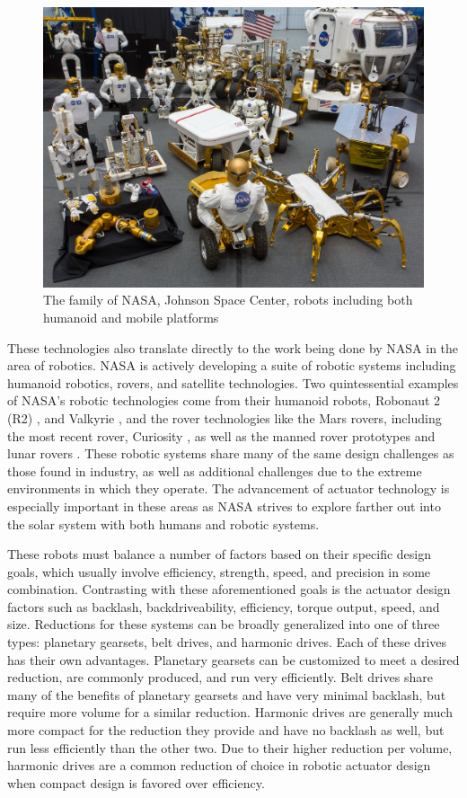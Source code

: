 \begin{figure}[!b]
   \centering
   \includegraphics[width=0.7\linewidth]{fig/robot_collage}
   \caption{The family of NASA, Johnson Space Center, robots including both humanoid and mobile platforms}
   \label{fig/robot_collage}
\end{figure}

These technologies also translate directly to the work being done by NASA in the area of robotics. 
NASA is actively developing a suite of robotic systems including humanoid robotics, rovers, and satellite technologies. 
Two quintessential examples of NASA's robotic technologies come from their humanoid robots, Robonaut 2 (R2) \cite{ref:r2}, and Valkyrie \cite{ref:valkyrie}, and the rover technologies like the Mars rovers, including the most recent rover, Curiosity \cite{ref:curiosity}, as well as the manned rover prototypes \cite{ref:rover} and lunar rovers \cite{ref:RP}.
These robotic systems share many of the same design challenges as those found in industry, as well as additional challenges due to the extreme environments in which they operate. The advancement of actuator technology is especially important in these areas as NASA strives to explore farther out into the solar system with both humans and robotic systems. 

These robots must balance a number of factors based on their specific design goals, which usually involve efficiency, strength, speed, and precision in some combination. 
Contrasting with these aforementioned goals is the actuator design factors such as backlash, backdriveability, efficiency, torque output, speed, and size. 
Reductions for these systems can be broadly generalized into one of three types: planetary gearsets, belt drives, and harmonic drives. 
Each of these drives has their own advantages. 
Planetary gearsets can be customized to meet a desired reduction, are commonly produced, and run very efficiently.
Belt drives share many of the benefits of planetary gearsets and have very minimal backlash, but require more volume for a similar reduction. 
Harmonic drives are generally much more compact for the reduction they provide and have no backlash as well, but run less efficiently than the other two. 
Due to their higher reduction per volume, harmonic drives are a common reduction of choice in robotic actuator design when compact design is favored over efficiency.

